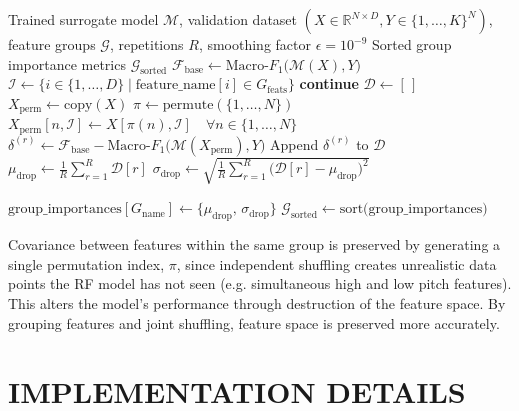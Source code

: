 \documentclass[conference,letterpaper]{IEEEtran}
\begin{document}
\begin{algorithm}[H]
\caption{Permutation Feature Group Importance}
\label{alg:pfgi}
\footnotesize{
\begin{algorithmic}[1]
\Require Trained surrogate model $\mathcal{M}$, validation dataset 
    $(X \in \mathbb{R}^{N \times D}, Y \in \{1,\dots,K\}^N)$, 
    feature groups $\mathcal{G}$, repetitions $R$, 
    smoothing factor $\epsilon = 10^{-9}$
\Ensure Sorted group importance metrics $\mathcal{G}_{\text{sorted}}$
\Statex
\State $\mathcal{F}_{\text{base}} \gets \text{Macro-}F_1\big(\mathcal{M}(X), Y\big)$
    \State $\mathcal{I} \gets \{i \in \{1,\dots,D\} \mid \text{feature\_name}[i] \in G_{\text{feats}}\}$
        \State \textbf{continue}
    \EndIf
    \State $\mathcal{D} \gets [\,]$
        \State $X_{\text{perm}} \gets \text{copy}(X)$
        \State $\pi \gets \text{permute}(\{1, \dots, N\})$
        \State $X_{\text{perm}}[n, \mathcal{I}] \gets X[\pi(n), \mathcal{I}] \quad \forall n \in \{1,\dots,N\}$
        \State $\delta^{(r)} \gets \mathcal{F}_{\text{base}} - \text{Macro-}F_1\big(\mathcal{M}(X_{\text{perm}}), Y\big)$
        \State Append $\delta^{(r)}$ to $\mathcal{D}$
    \EndFor
    \State $\mu_{\text{drop}} \gets \frac{1}{R}\sum_{r=1}^{R} \mathcal{D}[r]$
    \State $\sigma_{\text{drop}} \gets \sqrt{\frac{1}{R}\sum_{r=1}^{R} \big(\mathcal{D}[r] - \mu_{\text{drop}}\big)^2}$

    \State $\text{group\_importances}[G_{\text{name}}] \gets \{\mu_{\text{drop}},\, \sigma_{\text{drop}}\}$
\EndFor
\Statex
\State \Return $\mathcal{G}_{\text{sorted}} \gets \text{sort}\big(\text{group\_importances})$
\end{algorithmic}
}
\end{algorithm}


\noindent Covariance between features within the same group is preserved by generating a single permutation index, $\pi$, since independent shuffling creates unrealistic data points the RF model has not seen (e.g. simultaneous high and low pitch features). This alters the model's performance through destruction of the feature space. By grouping features and joint shuffling, feature space is preserved more accurately.


\section{IMPLEMENTATION DETAILS}
\end{document}
